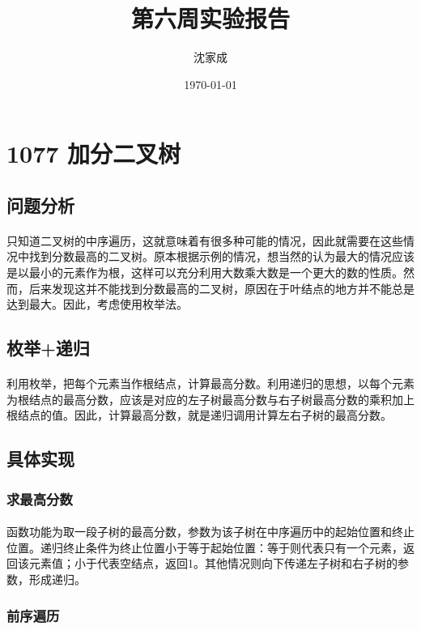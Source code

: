 \documentclass[UTF-8, 12pt]{ctexart}
\title{第六周实验报告}
\author{沈家成}
\date{\today}
\begin{document}
\maketitle
\section{1077 加分二叉树}
    \subsection{问题分析}
    \paragraph{}
    只知道二叉树的中序遍历，这就意味着有很多种可能的情况，因此就需要在这些情况中找到分数最高的二叉树。原本根据示例的情况，想当然的认为最大的情况应该是以最小的元素作为根，这样可以充分利用大数乘大数是一个更大的数的性质。然而，后来发现这并不能找到分数最高的二叉树，原因在于叶结点的地方并不能总是达到最大。因此，考虑使用枚举法。
    
    \subsection{枚举+递归}
    \paragraph{}
    利用枚举，把每个元素当作根结点，计算最高分数。利用递归的思想，以每个元素为根结点的最高分数，应该是对应的左子树最高分数与右子树最高分数的乘积加上根结点的值。因此，计算最高分数，就是递归调用计算左右子树的最高分数。
    
    \subsection{具体实现}
    	\subsubsection{求最高分数}
    \paragraph{}
    函数功能为取一段子树的最高分数，参数为该子树在中序遍历中的起始位置和终止位置。递归终止条件为终止位置小于等于起始位置：等于则代表只有一个元素，返回该元素值；小于代表空结点，返回1。其他情况则向下传递左子树和右子树的参数，形成递归。
    	\subsubsection{前序遍历}
\end{document}
